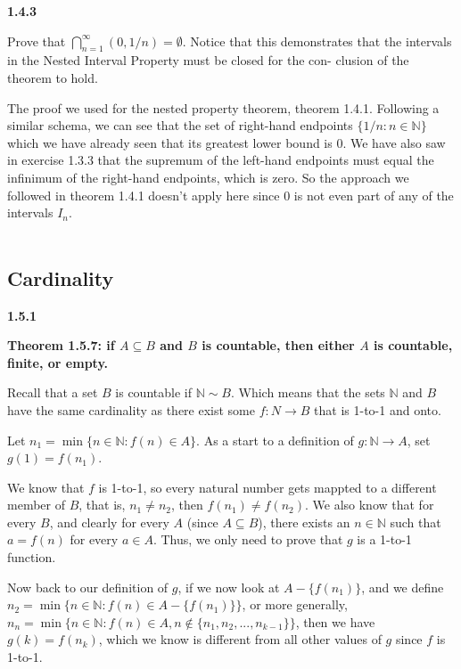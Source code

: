 \label{abbott:1.4.3}
\textbf{1.4.3}

Prove that $\bigcap^{\infty}_{n=1} (0, 1/n) = \emptyset$. 
Notice that this demonstrates that the intervals in the Nested Interval Property
must be closed for the con- clusion of the theorem to hold.

The proof we used for the nested property theorem, theorem 1.4.1.
Following a similar schema, we can see that the set of right-hand endpoints $\{ 1/n : n\in\mathbb{N} \}$ which we have
already seen that its greatest lower bound is 0.
We have also saw in exercise 1.3.3 that the supremum of the left-hand endpoints must equal the infinimum of the right-hand
endpoints, which is zero.
So the approach we followed in theorem 1.4.1 doesn't apply here since 0 is not even part of any of the intervals $I_n$.
\\~\\





\subsection{Cardinality}


\textbf{1.5.1}

\textbf{Theorem 1.5.7: if $A \subseteq B$ and $B$ is countable, then either $A$ is countable, finite, or empty.}

Recall that a set $B$ is countable if $\mathbb{N} \sim B$.
Which means that the sets $\mathbb{N}$ and $B$ have the same cardinality as there exist some $f : N \rightarrow B$
that is 1-to-1 and onto.

Let $n_1 = \min \{ n \in \mathbb{N} : f(n) \in A \}$.
As a start to a definition of $g: \mathbb{N} \rightarrow A$, set $g(1) = f(n_1)$.

We know that $f$ is 1-to-1, so every natural number gets mappted to a different member of $B$, that is, $n_1 \neq n_2$, then
$f(n_1) \neq f(n_2)$.
We also know that for every $B$, and clearly for every $A$ (since $A \subseteq B$), there exists an $n \in \mathbb{N}$
such that $a = f(n)$ for every $a \in A$.
Thus, we only need to prove that $g$ is a 1-to-1 function.

Now back to our definition of $g$, if we now look at $A - \{f(n_1)\}$, and we define
$n_2 = \min \{ n \in \mathbb{N} : f(n) \in A - \{f(n_1)\} \}$, or more generally,
$n_n = \min \{ n \in \mathbb{N} : f(n) \in A, n \notin \{n_1, n_2, ..., n_{k-1}\} \}$,
then we have $g(k) = f(n_k)$, which we know is different from all other values of $g$ since $f$ is 1-to-1.
\\~\\




